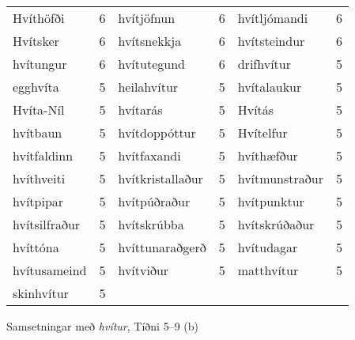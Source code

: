 \documentclass{../litmal.tex}{subfiles}
\begin{document}
\begin{wordlist}[H]
\begin{tcolorbox}
\begin{tabular}{BlBlBl}
		Hvíthöfði		& 6	 	& 
		hvítjöfnun	& 6		& 
		hvítljómandi	& 6		\\  %
		Hvítsker		& 6		& 
		hvítsnekkja	& 6		& 	
		hvítsteindur	& 6		\\  %
		hvítungur		& 6		& 
		hvítutegund	& 6		& 
		drifhvítur		& 5		\\  %
		egghvíta		& 5		& 
		heilahvítur	& 5		& 	
		hvítalaukur	& 5		\\  %
		Hvíta-Níl		& 5		& 
		hvítarás		& 5		& 
		Hvítás		& 5		\\ 	%
		hvítbaun		& 5		& 	
		hvítdoppóttur 	& 5		& 
		Hvítelfur		& 5		\\  %
		hvítfaldinn	& 5		& 
		hvítfaxandi	& 5		& 
		hvíthæfður	& 5		\\  %
		hvíthveiti		& 5		& 
		hvítkristallaður 	& 5		& 
		hvítmunstraður& 5		\\  %
		hvítpipar		& 5		&  
		hvítpúðraður	& 5		& 
		hvítpunktur	& 5		\\ 	%
		hvítsilfraður	& 5		& 
		hvítskrúbba	& 5		&  	
		hvítskrúðaður 	& 5		\\  %
		hvíttóna		& 5		& 
		hvíttunaraðgerð & 5	& 	
		hvítudagar	& 5		\\ 	%
		hvítusameind 	& 5		& 
		hvítviður		& 5		& 
		matthvítur	& 5		\\  %
		skinhvítur		& 5		& 
					&		&
					&
	\end{tabular}
	
\end{tcolorbox}
	\caption{Samsetningar með \textit{hvítur}, Tíðni 5--9 (b)}
	\label{listi:hvitt.5b}
\end{wordlist}

\end{document}
